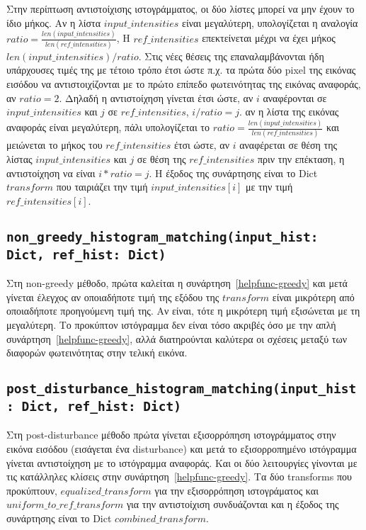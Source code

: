 \documentclass{article}
\begin{document}
Στην περίπτωση αντιστοίχισης ιστογράμματος, οι δύο λίστες 
μπορεί να μην έχουν το ίδιο μήκος. Αν η λίστα $input\_intensities$ είναι μεγαλύτερη, 
υπολογίζεται η αναλογία $ratio = \frac{len(input\_intensities)}{len(ref\_intensities)}$,
Η $ref\_intensities$ επεκτείνεται μέχρι να έχει μήκος 
$len(input\_intensities) / ratio$. Στις νέες θέσεις της επαναλαμβάνονται
ήδη υπάρχουσες τιμές της με τέτοιο τρόπο έτσι ώστε π.χ. τα πρώτα δύο pixel
της εικόνας εισόδου να αντιστοιχί\-ζονται με το πρώτο
επίπεδο φωτεινότητας της εικόνας αναφοράς, αν $ratio = 2$. 
Δηλαδή η αντιστοίχηση γίνεται έτσι ώστε,
αν $i$ αναφέρονται σε $input\_intensities$ και $j$ σε 
$ref\_intensities$, $ i / ratio = j$.
αν η λίστα της εικόνας αναφοράς είναι μεγαλύτερη, 
πάλι υπολογίζεται το $ratio = \frac{len(input\_intensities)}{len(ref\_intensities)}$
και μειώνεται το μήκος του $ref\_intensities$ έτσι ώστε,
αν $i$ αναφέρεται σε θέση της λίστας $input\_intensities$ και $j$ σε 
θέση της $ref\_intensities$ πριν την επέκταση, η αντιστοίχηση να είναι $i * ratio  = j$.
Η έξοδος της συνάρτησης είναι το Dict $transform$ που ταιριάζει
την τιμή $input\_intensities\left[i\right]$ με την τιμή $ref\_intensities\left[i\right]$.

\subsection{\texttt{non\_greedy\_histogram\_matching(input\_hist: Dict, ref\_hist: Dict)}}\label{helpfunc-nongreedy}

Στη non-greedy μέθοδο, πρώτα καλείται η συνάρτηση~\ref{helpfunc-greedy} και μετά γίνεται έλεγχος
αν οποιαδήποτε τιμή της εξόδου της $transform$ είναι μικρότερη από οποιαδήποτε προηγούμενη τιμή
της. Αν είναι, τότε η μικρότερη τιμή εξισώνεται με τη μεγαλύτερη. Το προκύπτον ιστόγραμμα 
δεν είναι τόσο ακριβές όσο με την απλή συνάρτηση~\ref{helpfunc-greedy}, αλλά διατηρούνται
καλύτερα οι σχέσεις μεταξύ των διαφορών φωτεινότητας στην τελική εικόνα.

\subsection{\texttt{post\_disturbance\_histogram\_matching(input\_hist: Dict, ref\_hist: Dict)}}\label{helpfunc-post}

Στη post-disturbance μέθοδο πρώτα γίνεται εξισορρόπηση ιστογράμματος στην εικόνα 
εισόδου (εισάγεται ένα disturbance) και μετά το εξισορροπημένο ιστόγραμμα 
γίνεται αντιστοίχηση με το ιστόγραμμα αναφοράς. Και οι δύο λειτουργίες γίνονται 
με τις κατάλληλες κλίσεις στην συνάρτηση~\ref{helpfunc-greedy}. Τα δύο transforms 
που προκύπτουν, $equalized\_transform$ για την εξισορρόπηση ιστογράματος και 
$uniform\_to\_ref\_transform$ για την αντιστοί\-χιση συνδυάζονται και η
έξοδος της συνάρτησης είναι το Dict $combined\_transform$.
\end{document}
